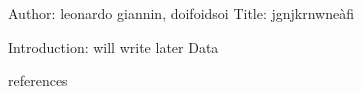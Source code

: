 Author: leonardo giannin, doifoidsoi
Title: jgnjkrnwneàfi

Introduction: will write later
Data

references 
